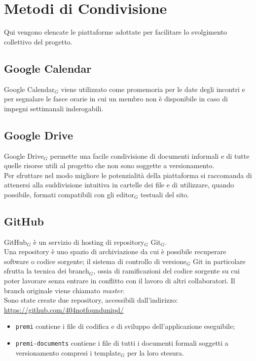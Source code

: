 \section{Metodi di Condivisione}
Qui vengono elencate le piattaforme adottate per facilitare lo svolgimento collettivo del progetto.

\subsection{Google Calendar}
Google Calendar$_G$ viene utilizzato come promemoria per le date degli incontri e per segnalare le fasce orarie in cui un membro non è disponibile in caso di impegni settimanali inderogabili.

\subsection{Google Drive}
Google Drive$_G$ permette una facile condivisione di documenti informali e di tutte quelle risorse utili al progetto che non sono soggette a versionamento. \\
Per sfruttare nel modo migliore le potenzialità della piattaforma si raccomanda di attenersi alla suddivisione intuitiva in cartelle dei file e di utilizzare, quando possibile, formati compatibili con gli editor$_G$ testuali del sito.

\subsection{GitHub}
GitHub$_G$ è un servizio di hosting di repository$_G$ Git$_G$. \\
Una repository è uno spazio di archiviazione da cui è possibile recuperare software o codice sorgente; il sistema di controllo di versione$_G$ Git in particolare sfrutta la tecnica dei branch$_G$, ossia di ramificazioni del codice sorgente su cui poter lavorare senza  entrare in conflitto con il lavoro di altri collaboratori. Il branch originale viene chiamato \textit{master}. \\
Sono state create due repository, accessibili dall'indirizzo:\\ 
\url{https://github.com/404notfoundunipd/}
\begin{itemize}
\item \texttt{premi} contiene i file di codifica e di sviluppo dell'applicazione eseguibile;
\item \texttt{premi-documents} contiene i file di tutti i documenti formali soggetti a versionamento compresi i template$_G$ per la loro stesura.
\end{itemize}

